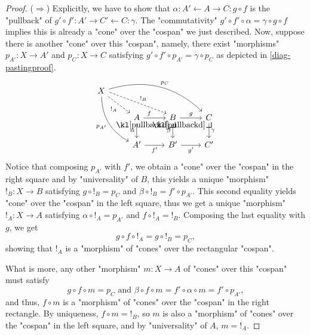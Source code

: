 \documentclass[main.tex]{subfiles}
\begin{document}
\begin{proof}
    ($\Rightarrow$) Explicitly, we have to show that $\alpha : A' \leftarrow A \rightarrow C : g \circ f$ is the "pullback" of $g' \circ f' : A' \rightarrow C' \leftarrow C:\gamma$. The "commutativity" $g'\circ f' \circ \alpha = \gamma \circ g \circ f$ implies this is already a "cone" over the "cospan" we just described. Now, suppose there is another "cone" over this "cospan", namely, there exist "morphisms" $p_{A'}: X \rightarrow A'$ and $p_C: X \rightarrow C$ satisfying $g'\circ f' \circ p_{A'} = \gamma \circ p_C$ as depicted in \eqref{diag-pastingproof}.
    \begin{equation}\label{diag-pastingproof}
        \begin{tikzcd}
            X \arrow[rrrd, "p_C", bend left] \arrow[rdd, "p_{A'}"', bend right] \arrow[rrd, "{!}_B", dashed, shift left] \arrow[rd, "{!}_A"', dashed] & & & \\
            & A \arrow[r, near start, "f"] \arrow[d, "\alpha"'] \arrow[rd, "\pullbackd", phantom, very near start] & B \arrow[r, "g"] \arrow[d, "\beta"'] \arrow[rd, "\pullbackd", phantom, very near start] & C \arrow[d, "\gamma"] \\
            & A' \arrow[r, "f'"'] & B' \arrow[r, "g'"'] & C'
        \end{tikzcd}
    \end{equation}
    Notice that composing $p_{A'}$ with $f'$, we obtain a "cone" over the "cospan" in the right square and by "universality" of $B$, this yields a unique "morphism" ${!}_B: X \rightarrow B$ satisfying $g \circ {!}_B = p_C$ and $\beta \circ {!}_B = f' \circ p_{A'}$. This second equality yields "cone" over the "cospan" in the left square, thus we get a unique "morphism" ${!}_A : X \rightarrow A$ satisfying $\alpha \circ {!}_A = p_{A'}$ and $f \circ {!}_A = {!}_B$. Composing the last equality with $g$, we get
    \[g \circ f \circ {!}_A = g \circ {!}_B = p_C,\]
    showing that ${!}_A$ is a "morphism" of "cones" over the rectangular "cospan".

    What is more, any other "morphism" $m: X \rightarrow A$ of "cones" over this "cospan" must satisfy
    \[g \circ f \circ m = p_C \text{ and } \beta \circ f \circ m = f' \circ \alpha \circ m = f' \circ p_{A'},\]
    and thus, $f\circ m$ is a "morphism" of "cones" over the "cospan" in the right rectangle. By uniqueness, $f\circ m = {!}_B$, so $m$ is also a "morphism" of "cones" over the "cospan" in the left square, and by "universality" of $A$, $m = {!}_A$.
    

\end{proof}
\end{document}
